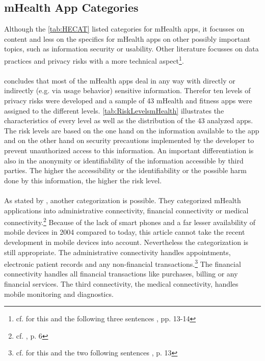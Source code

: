 \subsection{mHealth App Categories}
Although the \ref{tab:HECAT} listed categories for mHealth apps, it focusses on content and less on the specifics for mHealth apps on other possibly important topics, such as information security or usability. Other literature focusses on data practices and privacy risks with a more technical aspect\footnote{cf. for this and the following three sentences \cite{Njie.2013}, pp. 13-14}. 
\\
\\
\cite{Njie.2013} concludes that most of the mHealth apps deal in any way with directly or indirectly (e.g. via usage behavior) sensitive information. Therefor ten levels of privacy risks were developed and a sample of 43 mHealth and fitness apps were assigned to the different levels. \ref{tab:RiskLevelsmHealth} illustrates the characteristics of every level as well as the distribution of the 43 analyzed apps. 
\\
The risk levels are based on the one hand on the information available to the app and on the other hand on security precautions implemented by the developer to prevent unauthorized access to this information. An important differentiation is also in the anonymity or identifiability of the information accessible by third parties. The higher the accessibility or the identifiability or the possible harm done by this information, the higher the risk level.
\\
\\
As stated by \cite{Istepanian.2004}, another categorization is possible. They categorized mHealth applications into administrative connectivity, financial connectivity or medical connectivity.\footnote{cf. \cite{Istepanian.2004}, p. 6} Because of the lack of smart phones and a far lesser availability of mobile devices in 2004 compared to today, this article cannot take the recent development in mobile devices into account. Nevertheless the categorization is still appropriate. The administrative connectivity handles appointments, electronic patient records and any non-financial transactions.\footnote{cf. for this and the two following sentences \cite{Istepanian.2004}, p. 13} The financial connectivity handles all financial transactions like purchases, billing or any financial services. The third connectivity, the medical connectivity, handles mobile monitoring and diagnostics.
\\
